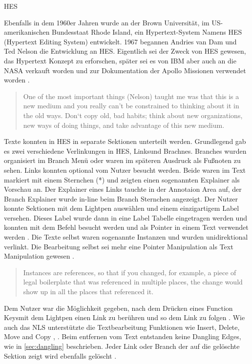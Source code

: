 \begin{section}{HES}
\label{sec:hes}

Ebenfalls in dem 1960er Jahren wurde an der Brown Universität, im US-amerikanischen Bundesstaat Rhode Island, ein Hypertext-System Namens \glqq HES\grqq{ } (Hypertext Editing System) entwickelt. 1967 begannen Andries van Dam und Ted Nelson die Entwicklung an HES. Eigentlich sei der Zweck von HES gewesen, das Hypertext Konzept zu erforschen, später sei es von IBM aber auch an die NASA verkauft worden und zur Dokumentation der Apollo Missionen verwendet worden \cite{Dam1988}.

\begin{quote}
\glqq One of the most important things (Nelson) taught me was that this is a new medium and you really can’t be constrained to thinking about it in the old ways. Don‘t copy old, bad habits; think about new organizations, new ways of doing things, and take advantage of this new medium.\grqq{ }\cite{Dam1988}
\end{quote}

Texte konnten in HES in separate Sektionen unterteilt werden. Grundlegend gab es zwei verschiedene Verlinkungen in HES, \glqq Links\grqq{ }und \glqq Brachnes\grqq{ }. Branches wurden organisiert im Branch Menü oder waren im späteren Ausdruck als Fußnoten zu sehen. Links konnten optional vom Nutzer besucht werden. Beide waren im Text markiert mit einem Sternchen (*) und zeigten einen sogenannten Explainer als Vorschau an. Der Explainer eines Links tauchte in der Annotaion Area auf, der Branch Explainer wurde in-line beim Branch Sternchen angezeigt. Der Nutzer konnte Sektionen mit dem Lightpen auswählen und einem einzigartigem Label versehen. Dieses Label wurde dann in eine Label Tabelle eingetragen werden und konnten mit dem Befehl besucht werden und als Pointer in einem Text verwendet werden \cite{Dam1969}. Die Texte selbst waren sogenannte Instanzen und wurden unidirektional verlinkt. Die Bearbeitung selbst sei mehr eine Pointer Manipulation als Text Manipulation gewesen \cite[S. 890]{Dam1988}.

\begin{quote}
\glqq Instances are references, so that if you changed, for example, a piece of legal boilerplate that was referenced in multiple places, the change would show up in all the places that referenced it. \grqq{ }\cite{Dam1988}
\end{quote}

Dem Nutzer war die Möglichkeit gegeben, nach dem Drücken eines \glqq Function Keys\grqq{ }mit dem Lightpen einen Link zu berühren und so dem Link zu folgen \cite[S.23]{Dam1969}. Wie auch das NLS unterstützte die Textbearbeitung Funktionen wie Insert, Delete, Move and Copy \cite[S.10-14]{Dam1969}, \cite[S. 889]{Dam1988}. Beim entfernen vom Text entstanden keine Dangling Edges, wie in \ref{sec:dangling} beschrieben. Jeder Link oder Branch der auf die gelöschte Sektion zeigt wird ebenfalls gelöscht \cite[S.12]{Dam1969}.


\end{section}
